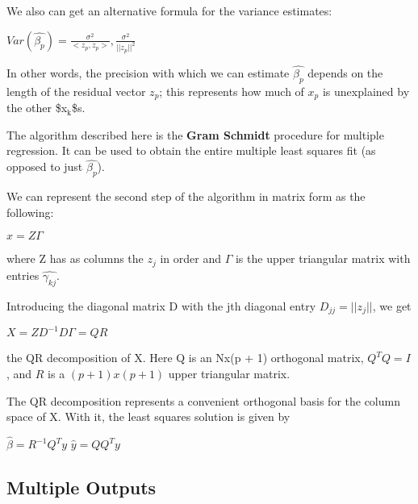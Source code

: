 \documentclass[11pt]{article}
\begin{document}
We also can get an alternative formula for the variance estimates:

\(Var(\hat{\beta_p}) = \frac{\sigma^2}{<z_p, z_p>}, \frac{\sigma^2}{||z_p||^2}\)

In other words, the precision with which we can estimate \(\hat{\beta_p}\) depends on the length of the residual vector \(z_p\); this represents how much of \(x_p\) is unexplained by the other \$x\(_{\text{k}}\)\$s.

The algorithm described here is the \textbf{Gram Schmidt} procedure for multiple regression. It can be used to obtain the entire multiple least squares fit (as opposed to just \(\hat{\beta_p}\)).

We can represent the second step of the algorithm in matrix form as the following:

\(x = Z\Gamma\)

where Z has as columns the \(z_j\) in order and \(\Gamma\) is the upper triangular matrix with entries \(\hat{\gamma_{kj}}\). 

Introducing the diagonal matrix D with the jth diagonal entry \(D_{jj} = ||z_j||\), we get 

\(X = ZD^{-1}D\Gamma = QR\)

the QR decomposition of X. Here Q is an Nx(p + 1) orthogonal matrix, \(Q^TQ = I\), and \(R\) is a \((p+1)x(p+1)\) upper triangular matrix. 

The QR decomposition represents a convenient orthogonal basis for the column space of X. With it, the least squares solution is given by

\(\hat{\beta} = R^{-1}Q^Ty\)
\(\hat{y} = QQ^Ty\)

\subsection{Multiple Outputs}
\label{sec:org11ff996}
\end{document}

